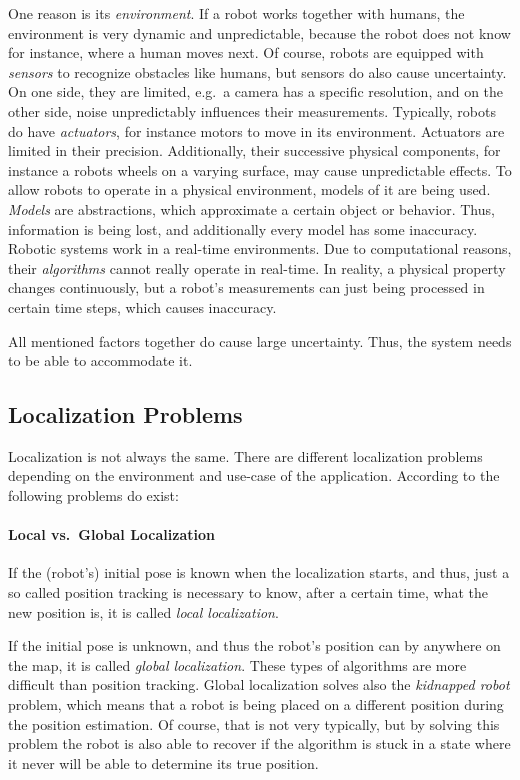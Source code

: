 One reason is its \emph{environment}. If a robot works together with humans, the environment is very dynamic and unpredictable, because the robot does not know for instance, where a human moves next.
Of course, robots are equipped with \emph{sensors} to recognize obstacles like humans, but sensors do also cause uncertainty. On one side, they are limited, e.g.\ a camera has a specific resolution, and on the other side, noise unpredictably influences their measurements. 
Typically, robots do have \emph{actuators}, for instance motors to move in its environment. Actuators are limited in their precision. Additionally, their successive physical components, for instance a robots wheels on a varying surface, may cause unpredictable effects.
To allow robots to operate in a physical environment, models of it are being used. \emph{Models} are abstractions, which approximate a certain object or behavior.  Thus, information is being lost, and additionally every model has some inaccuracy. Robotic systems work in a real-time environments. Due to computational reasons, their \emph{algorithms} cannot really operate in real-time. In reality, a physical property changes continuously, but a robot's measurements can just being processed in certain time steps, which causes inaccuracy. 

All mentioned factors together do cause large uncertainty. Thus, the system needs to be able to accommodate it.

\subsection{Localization Problems}
Localization is not always the same. There are different localization problems depending on the environment and use-case of the application. According to \citet{thrun:prob_robo} the following problems do exist:

\paragraph{Local vs.\ Global Localization} If the (robot's) initial pose is known when the localization starts, and thus, just a so called position tracking is necessary to know, after a certain time, what the new position is, it is called \emph{local localization}.

If the initial pose is unknown, and thus the robot's position can by anywhere on the map, it is called \emph{global localization}. These types of algorithms are more difficult than position tracking. Global localization solves also the \emph{kidnapped robot} problem, which means that a robot is being placed on a different position during the position estimation. Of course, that is not very typically, but by solving this problem the robot is also able to recover if the algorithm is stuck in a state where it never will be able to determine its true position.

